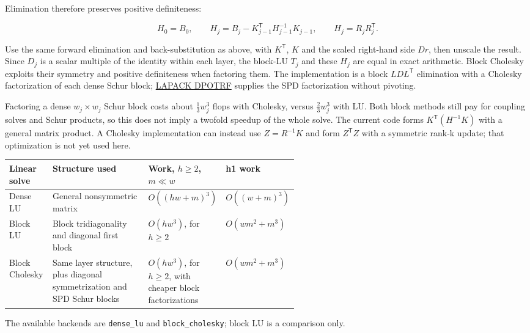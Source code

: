 \documentclass[11pt,a4paper]{article}
\begin{document}
Elimination therefore preserves positive definiteness:

\[
H_0 = B_0, \qquad
H_j = B_j-K_{j-1}^{\mathsf T}H_{j-1}^{-1}K_{j-1},
\qquad H_j=R_jR_j^{\mathsf T}.
\]

Use the same forward elimination and back-substitution as above, with $K^{\mathsf T}$,
$K$ and the scaled right-hand side $Dr$, then unscale the result. Since $D_j$ is a
scalar multiple of the identity within each layer, the block-LU $T_{j}$ and these
$H_{j}$ are equal in exact arithmetic. Block Cholesky exploits their symmetry and
positive definiteness when factoring them. The implementation is a block $LDL^{\mathsf
T}$ elimination with a Cholesky factorization of each dense Schur block;
\href{https://www.netlib.org/lapack/explore-html/d2/d09/group__potrf_ga84e90859b02139934b166e579dd211d4.html}{LAPACK
DPOTRF} supplies the SPD factorization without pivoting.

Factoring a dense $w_j\times w_j$ Schur block costs about $\frac{1}{3}w_j^3$ flops with
Cholesky, versus $\frac{2}{3}w_j^3$ with LU. Both block methods still pay for coupling
solves and Schur products, so this does not imply a twofold speedup of the whole solve.
The current code forms $K^{\mathsf T}(H^{-1}K)$ with a general matrix product. A
Cholesky implementation can instead use $Z=R^{-1}K$ and form $Z^{\mathsf T}Z$ with a
symmetric rank-k update; that optimization is not yet used here.

\begin{center}
\small
\setlength{\tabcolsep}{4pt}
\begin{tabularx}{\linewidth}{@{}p{0.15\linewidth}X p{0.22\linewidth}p{0.18\linewidth}@{}}
\toprule
Linear solve & Structure used & Work, $h\geq2$, $m\ll w$ & h1 work \\
\midrule
Dense LU & General nonsymmetric matrix & $O((hw+m)^3)$ & $O((w+m)^3)$ \\
\addlinespace
Block LU & Block tridiagonality and diagonal first block & $O(hw^3)$, for $h\geq2$ & $O(wm^2+m^3)$ \\
\addlinespace
Block Cholesky & Same layer structure, plus diagonal symmetrization and SPD Schur blocks & $O(hw^3)$, for $h\geq2$, with cheaper block factorizations & $O(wm^2+m^3)$ \\
\bottomrule
\end{tabularx}
\end{center}

The available backends are \texttt{dense\_lu} and \texttt{block\_cholesky}; block LU is a comparison only.
\end{document}
